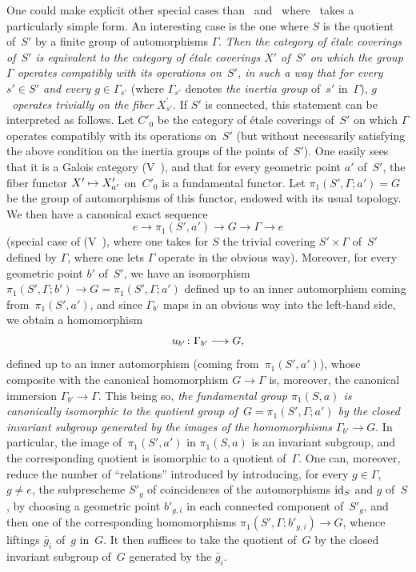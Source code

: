 \begin{remark}
\label{IX.5.8}
One could make explicit other special cases than~
and~ where~ takes a particularly simple form.
An interesting case is the one where $S$ is the quotient of~$S'$ by a
finite group of automorphisms $\Gamma$. \emph{Then the category of
étale coverings of~$S'$ is equivalent to the category of étale
coverings $X'$ of~$S'$ on which the group $\Gamma$ operates compatibly
with its operations on~$S'$, in such a way that for every $s'\in S'$
and every $g\in \Gamma_{s'}$} (where $\Gamma_{s'}$ denotes \emph{the
inertia group} of~$s'$ in~$\Gamma$), \emph{$g$~operates trivially on
the fiber} $X_{s'}^\prime$. If $S'$ is connected, this statement can
be interpreted as follows. Let $C'_0$ be the category of étale
coverings of~$S'$ on which $\Gamma$ operates compatibly with its
operations on~$S'$ (but without necessarily satisfying the above
condition on the inertia groups of the points of~$S'$). One easily
sees that it is a Galois category (V~), and that for
every geometric point $a'$ of~$S'$, the fiber functor $X'\mto X_{a'}'$
on~$C'_0$ is a fundamental functor. Let $\pi_1(S',\Gamma;a')=G$ be
the group of automorphisms of this functor, endowed with its usual
topology. We then have a canonical exact sequence
$$
e\to \pi_1(S',a')\to G\to \Gamma\to e
$$
(special case of (V~), where one takes for $S$ the trivial
covering $S'\times \Gamma$ of~$S'$ defined by $\Gamma$, where one
lets $\Gamma$ operate in the obvious way). Moreover, for every
geometric point $b'$ of~$S'$, we have an isomorphism
$\pi_1(S', \Gamma ; b' )\to G = \pi_1(S', \Gamma; a')$ defined up to
an inner automorphism coming from~$\pi_1(S',a')$, and since
$\Gamma_{b'}$ maps in an obvious way into the left-hand side, we
obtain a homomorphism
$$
u_{b'}\colon \Gamma_{b'}\to G \quoi,
$$
defined up to an inner automorphism (coming from~$\pi_1(S',a')$),
whose composite with the canonical homomorphism $G\to \Gamma$ is,
moreover, the canonical immersion $\Gamma_{b'} \to \Gamma$. This
being so, \emph{the fundamental group $\pi_1(S,a)$ \emph{is}
canonically isomorphic to the quotient group of~$G = \pi_1(S',
\Gamma; a')$ by the closed invariant subgroup generated by the images
of the homomorphisms $\Gamma_{b'} \to G$}. In particular, the image
of~$\pi_1(S',a')$ in $\pi_1(S,a)$ is an invariant subgroup, and the
corresponding quotient is isomorphic to a quotient of~$\Gamma$. One
can, moreover, reduce the number of ``relations'' introduced by
introducing, for every $g\in \Gamma$, $ g\neq e$, the
subprescheme $S'_g$ of coincidences of the automorphisms $\mathrm{id}_S$ and
$g$ of~$S$, by choosing a geometric point $b'_{g,i}$ in each connected
component of~$S'_g$, and then one of the corresponding homomorphisms
$\pi_1(S',\Gamma; b'_{g,i})\to G$, whence liftings $\bar{g}_i$ of~$g$
in~$G$. It then suffices to take the quotient of~$G$ by the closed
invariant subgroup of~$G$ generated by the $\bar{g}_i$.


\end{remark}
